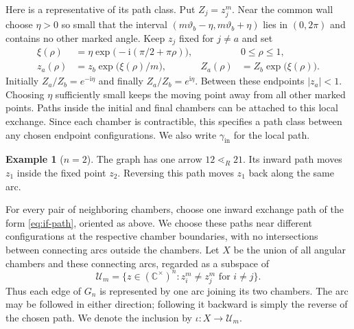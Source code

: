 \documentclass[12pt]{amsart}
\theoremstyle{definition}
\numberwithin{equation}{section}
\theoremstyle{definition}
\newtheorem*{example}{Example}
\let\mc\mathcal
\let\gm\gamma
\let\le\leqslant
\def\C{{\mathbb C}}
\def\beq{\begin{equation}}
\def\eeq{\end{equation}}
\begin{document}
Here is a representative of its path class. Put $Z_j=z_j^m$.
Near the common wall choose $\eta>0$ so small that the interval
$(m\vartheta_b-\eta,m\vartheta_b+\eta)$ lies in $(0,2\pi)$
and contains no other marked angle. Keep $z_j$ fixed for $j\ne a$
and set
\beq\label{eq:if-path}
 \begin{aligned}
 \xi(\rho)&=\eta\exp\bigl(-\mathrm{i}(\pi/2+\pi\rho)\bigr),
                         &&0\le\rho\le1,\\
 z_a(\rho)&=z_b\exp\bigl(\xi(\rho)/m\bigr),
 &Z_a(\rho)&=Z_b\exp\bigl(\xi(\rho)\bigr).
 \end{aligned}
\eeq
Initially $Z_a/Z_b=e^{-\mathrm{i}\eta}$ and finally
$Z_a/Z_b=e^{\mathrm{i}\eta}$. Between these endpoints $|z_a|<1$.
Choosing $\eta$ sufficiently small keeps the moving point away
from all other marked points. Paths inside the initial and final
chambers can be attached to this local exchange. Since each chamber
is contractible, this specifies a path class between any chosen
endpoint configurations. We also write $\gm_{\mathrm{in}}$ for
the local path.

\begin{example}[$n=2$]
The graph has one arrow $12\lessdot_R21$. Its inward path
moves $z_1$ inside the fixed point $z_2$. Reversing this path
moves $z_1$ back along the same arc.
\end{example}

For every pair of neighboring chambers, choose one inward
exchange path of the form \eqref{eq:if-path}, oriented as above.
We choose these paths near different configurations at the
respective chamber boundaries, with no intersections between
connecting arcs outside the chambers.
Let $X$ be the union of all angular chambers and these connecting
arcs, regarded as a subspace of
\[
 \mc U_m=\{z\in(\C^\times)^n:z_i^m\ne z_j^m\text{ for }i\ne j\}.
\]
Thus each edge of $G_n$ is represented by one arc joining its two
chambers. The arc may be followed in either direction; following
it backward is simply the reverse of the chosen path. We denote
the inclusion by $\iota:X\longrightarrow\mc U_m$.
\end{document}

